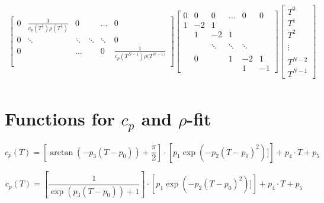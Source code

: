 \documentclass{scrartcl}[12pt, halfparskip]
\begin{document}
\begin{align*}
\begin{bmatrix}
		0 & \frac{1}{c_p(T^1) \rho(T^1)} & 0 & & \dots & 0 \\
		0 & \ddots & \ddots & \ddots & \ddots & 0 \\
		0 & & \dots & & 0 & \frac{1}{c_p(T^{N-1}) \rho(T^{N-1)}} \\
	\end{bmatrix}
	\begin{bmatrix}
		0 & 0 & 0 & \dots & 0 & 0 \\
		1 & -2 & 1 & & &  \\
		& 1 & -2 & 1 & \\
		\\
		& & \ddots & \ddots & \ddots \\
		\\
		& 0 & &  1 & -2 & 1 \\
		& & & & 1 & -1
	\end{bmatrix}
	\begin{bmatrix*}
		T^0 \\
		T^1 \\
		T^2 \\
		\\
		\vdots \\
		\\
		T^{N-2} \\
		T^{N-1}
	\end{bmatrix*} \\
\end{align*}

\section{Functions for $c_p$ and $\rho$-fit}

\begin{equation*}
	c_p(T) = \left[ \arctan (-p_3 (T-p_0)) + \frac{\pi}{2} \right] \cdot \left[ p_1 \exp(-p_2(T-p_0)^2)] \right] + p_4 \cdot T + p_5 
\end{equation*}


\begin{equation*}
	c_p(T) = \left[ \frac{1}{\exp(p_3(T-p_0)) + 1} \right] \cdot \left[ p_1 \exp(-p_2(T-p_0)^2)] \right] + p_4 \cdot T + p_5 
\end{equation*}
\end{document}
